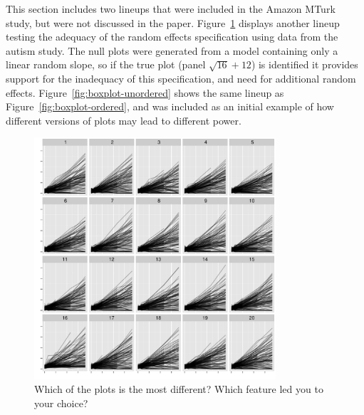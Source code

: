 \documentclass[12pt]{article} %
\begin{document}
This section includes two lineups that were included in the Amazon MTurk study, but were not discussed in the paper. Figure~\ref{fig:autism-ranef} displays another lineup testing the adequacy of the random effects specification using data from the autism study. The null plots were generated from a model containing only a linear random slope, so if the true plot (panel $\sqrt{16} + 12$) is identified it provides support for the inadequacy of this specification, and need for additional random effects. Figure~\ref{fig:boxplot-unordered} shows the same lineup as Figure~\ref{fig:boxplot-ordered}, and was included as an initial example of how different versions of plots may lead to different power.

\begin{figure}
	\centering
	\includegraphics[width=0.8\textwidth]{autism-fanned2-16.pdf}
	\caption{\label{fig:autism-ranef} Which of the plots is the most different? Which feature led you to your choice? }
\end{figure}
\end{document}
